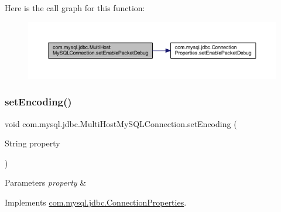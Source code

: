 Here is the call graph for this function\+:
\nopagebreak
\begin{figure}[H]
\begin{center}
\leavevmode
\includegraphics[width=350pt]{classcom_1_1mysql_1_1jdbc_1_1_multi_host_my_s_q_l_connection_a08ebf87d3511967776a8f2047453f72b_cgraph}
\end{center}
\end{figure}
\mbox{\label{classcom_1_1mysql_1_1jdbc_1_1_multi_host_my_s_q_l_connection_ac1a500dcfbd93a1256da1104c58cfc7f}} 
\subsubsection{\texorpdfstring{set\+Encoding()}{setEncoding()}}
{\footnotesize\ttfamily void com.\+mysql.\+jdbc.\+Multi\+Host\+My\+S\+Q\+L\+Connection.\+set\+Encoding (\begin{DoxyParamCaption}\item[{String}]{property }\end{DoxyParamCaption})}


\begin{DoxyParams}{Parameters}
{\em property} & \\
\hline
\end{DoxyParams}


Implements \mbox{\hyperlink{interfacecom_1_1mysql_1_1jdbc_1_1_connection_properties_a8d675a0b52e236df15eec3c77dfd8089}{com.\+mysql.\+jdbc.\+Connection\+Properties}}.

